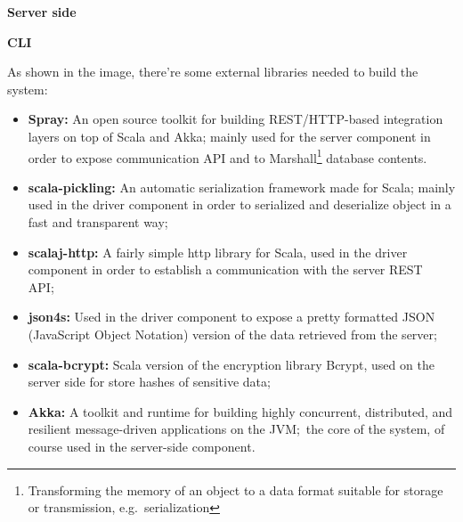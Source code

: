 \documentclass{scalatekids-article}
\begin{document}
\textbf{Server side}


\textbf{CLI}


As shown in the image, there're some external libraries needed to build the system:
\begin{itemize}
\item \textbf{Spray:} An open source toolkit for building REST/HTTP-based
  integration layers on top of Scala and Akka; mainly used for the server
  component in order to expose communication API and to
  Marshall\footnote{Transforming the memory of an object to a data format suitable
    for storage or transmission, e.g.\ serialization} database contents.
\item \textbf{scala-pickling:} An automatic serialization framework made for
  Scala; mainly used in the driver component in order to serialized and
  deserialize object in a fast and transparent way;
\item \textbf{scalaj-http:} A fairly simple http library for Scala, used in the
  driver component in order to establish a communication with the server REST API;\
\item \textbf{json4s:} Used in the driver component to expose a pretty formatted
  JSON (JavaScript Object Notation) version of the data retrieved from the server;
\item \textbf{scala-bcrypt:} Scala version of the encryption library Bcrypt,
  used on the server side for store hashes of sensitive data;
\item \textbf{Akka:} A toolkit and runtime for building highly concurrent,
  distributed, and resilient message-driven applications on the JVM;\ the core of
  the system, of course used in the server-side component.
\end{itemize}
\end{document}
